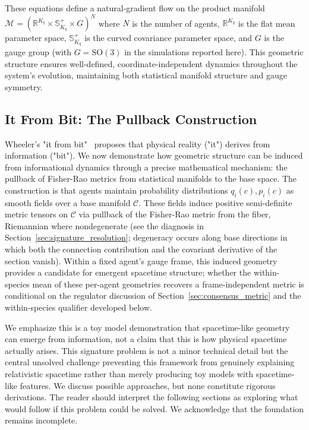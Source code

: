 \documentclass[11pt]{article}
\begin{document}
These equations define a natural-gradient flow on the product manifold $\mathcal{M} = (\mathbb{R}^{K_q} \times \mathbb{S}^+_{K_q} \times G)^N$ where $N$ is the number of agents, $\mathbb{R}^{K_q}$ is the flat mean parameter space, $\mathbb{S}^+_{K_q}$ is the curved covariance parameter space, and $G$ is the gauge group (with $G = \mathrm{SO}(3)$ in the simulations reported here). This geometric structure ensures well-defined, coordinate-independent dynamics throughout the system's evolution, maintaining both statistical manifold structure and gauge symmetry.

\subsection{It From Bit: The Pullback Construction}
\label{sec:pullback}

Wheeler's "it from bit"~\cite{Wheeler1990} proposes that physical reality ("it") derives from information ("bit"). We now demonstrate how geometric structure can be induced from informational dynamics through a precise mathematical mechanism: the pullback of Fisher-Rao metrics from statistical manifolds to the base space. The construction is that agents maintain probability distributions $q_i(c), p_i(c)$ as smooth fields over a base manifold $\mathcal{C}$. These fields induce positive semi-definite metric tensors on $\mathcal{C}$ via pullback of the Fisher-Rao metric from the fiber, Riemannian where nondegenerate (see the diagnosis in Section~\ref{sec:signature_resolution}; degeneracy occurs along base directions in which both the connection contribution and the covariant derivative of the section vanish). Within a fixed agent's gauge frame, this induced geometry provides a candidate for emergent spacetime structure; whether the within-species mean of these per-agent geometries recovers a frame-independent metric is conditional on the regulator discussion of Section~\ref{sec:consensus_metric} and the within-species qualifier developed below.

We emphasize this is a toy model demonstration that spacetime-like geometry can emerge from information, not a claim that this is how physical spacetime actually arises. This signature problem is not a minor technical detail but the central unsolved challenge preventing this framework from genuinely explaining relativistic spacetime rather than merely producing toy models with spacetime-like features. We discuss possible approaches, but none constitute rigorous derivations. The reader should interpret the following sections as exploring what would follow if this problem could be solved. We acknowledge that the foundation remains incomplete.
\end{document}
